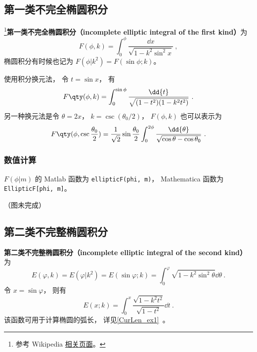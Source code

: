 

\subsection{第一类不完全椭圆积分}
\footnote{参考 Wikipedia \href{https://en.wikipedia.org/wiki/Elliptic_integral}{相关页面}。}\textbf{第一类不完全椭圆积分（incomplete elliptic integral of the first kind）}为
\begin{equation}\label{EliInt_eq1}
F(\phi, k) = \int_0^\phi \frac{\dd{x}}{\sqrt{1 - k^2\sin^2 x}}~,
\end{equation}
椭圆积分有时候也记为 $F(\phi | k^2) = F(\sin\phi ; k)$。

使用积分换元法， 令 $t = \sin x$， 有
\begin{equation}
F\qty(\phi, k) = \int_0^{\sin{\phi}} \frac{\dd{t}}{\sqrt{(1 - t^2)(1 - k^2 t^2)}}~.
\end{equation}
另一种换元法是令 $\theta = 2x$， $k = \csc(\theta_0/2)$， $F(\phi, k)$ 也可以表示为
\begin{equation}\label{EliInt_eq2}
F\qty(\phi, \csc\frac{\theta_0}{2}) = \frac{1}{\sqrt{2}} \sin\frac{\theta_0}{2} \int_0^{2\phi} \frac{\dd{\theta}}{\sqrt{\cos\theta - \cos\theta_0}}~.
\end{equation}

\subsubsection{数值计算}
$F(\phi | m)$ 的 Matlab 函数为 \verb|ellipticF(phi, m)|， %
Mathematica 函数为 \verb|EllipticF[phi, m]|。

（图未完成）

\subsection{第二类不完整椭圆积分}
\textbf{第二类不完整椭圆积分（incomplete elliptic integral of the second kind）}为
\begin{equation}\label{EliInt_eq3}
E(\varphi, k) = E(\varphi | k^2) = E(\sin\varphi; k) = \int_0^\varphi \sqrt{1 - k^2\sin^2\theta} \dd{\theta}~.
\end{equation}
令 $x = \sin\varphi$， 则有
\begin{equation}
E(x; k) = \int_0^x \frac{\sqrt{1 - k^2t^2}}{\sqrt{1 - t^2}}\dd{t}~.
\end{equation}
该函数可用于计算椭圆的弧长， 详见\autoref{CurLen_ex1}~。

